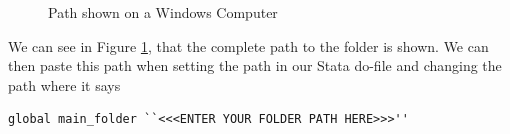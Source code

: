 \documentclass[]{article}
\begin{document}
\begin{figure}[H]
	\centering
	\caption{Path shown on a Windows Computer}
	\label{fig:pathwin2}
\end{figure}

We can see in Figure \ref{fig:pathwin2}, that the complete path to the folder is shown. We can then paste this path when setting the path in our Stata do-file and changing the path where it says \begin{verbatim}
global main_folder ``<<<ENTER YOUR FOLDER PATH HERE>>>''
\end{verbatim} 
	
\end{document}
